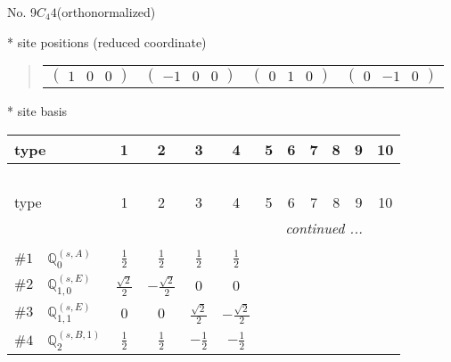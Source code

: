 \documentclass[fleqn,9pt,landscape]{jsarticle}
\begin{document}
\newpage
\begin{center}
\LARGE
No. 9\quad$C_{4}$\quad$4$\quad[ tetragonal ] (orthonormalized)
\end{center}
\vspace{5mm}
* site positions (reduced coordinate)
\begin{quote}
\begin{tabular}{cccc}
$ \begin{pmatrix} 1 & 0 & 0 \end{pmatrix} $ & $ \begin{pmatrix} -1 & 0 & 0 \end{pmatrix} $ & $ \begin{pmatrix} 0 & 1 & 0 \end{pmatrix} $ & $ \begin{pmatrix} 0 & -1 & 0 \end{pmatrix} $
\end{tabular}
\end{quote}
* site basis
\begin{center}
\renewcommand{\arraystretch}{1.3}
\begin{longtable}{lcccccccccc}
 \hline \hline
type & 1 & 2 & 3 & 4 & 5 & 6 & 7 & 8 & 9 & 10 \\ \hline \endfirsthead

\multicolumn{10}{l}{\tablename\ \thetable{}} \\
 \hline \hline
type & 1 & 2 & 3 & 4 & 5 & 6 & 7 & 8 & 9 & 10 \\ \hline \endhead

 \hline \hline
\multicolumn{10}{r}{\footnotesize\it continued ...} \\ \endfoot

 \hline \hline
\multicolumn{10}{r}{} \\ \endlastfoot

$ \#1\quad \mathbb{Q}_{0}^{(s,A)} $ & $ \frac{1}{2} $ & $ \frac{1}{2} $ & $ \frac{1}{2} $ & $ \frac{1}{2} $ \\ \hline
$ \#2\quad \mathbb{Q}_{1,0}^{(s,E)} $ & $ \frac{\sqrt{2}}{2} $ & $ - \frac{\sqrt{2}}{2} $ & $ 0 $ & $ 0 $ \\ \hline
$ \#3\quad \mathbb{Q}_{1,1}^{(s,E)} $ & $ 0 $ & $ 0 $ & $ \frac{\sqrt{2}}{2} $ & $ - \frac{\sqrt{2}}{2} $ \\ \hline
$ \#4\quad \mathbb{Q}_{2}^{(s,B,1)} $ & $ \frac{1}{2} $ & $ \frac{1}{2} $ & $ - \frac{1}{2} $ & $ - \frac{1}{2} $ \\
\end{longtable}
\end{center}
\end{document}

